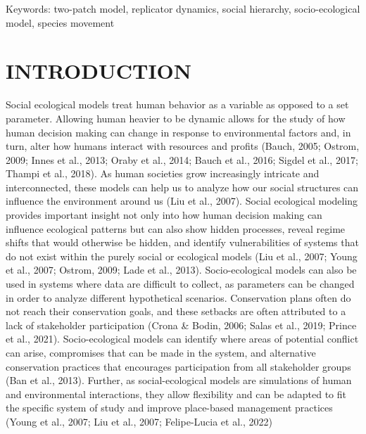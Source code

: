 \documentclass[
  12pt,
]{article}
\begin{document}
Keywords: two-patch model, replicator dynamics, social hierarchy, socio-ecological model, species movement

\hypertarget{introduction}{%
\section{INTRODUCTION}\label{introduction}}

Social ecological models treat human behavior as a variable as opposed to a set parameter. Allowing human heavier to be dynamic allows for the study of how human decision making can change in response to environmental factors and, in turn, alter how humans interact with resources and profits (Bauch, 2005; Ostrom, 2009; Innes et al., 2013; Oraby et al., 2014; Bauch et al., 2016; Sigdel et al., 2017; Thampi et al., 2018). As human societies grow increasingly intricate and interconnected, these models can help us to analyze how our social structures can influence the environment around us (Liu et al., 2007). Social ecological modeling provides important insight not only into how human decision making can influence ecological patterns but can also show hidden processes, reveal regime shifts that would otherwise be hidden, and identify vulnerabilities of systems that do not exist within the purely social or ecological models (Liu et al., 2007; Young et al., 2007; Ostrom, 2009; Lade et al., 2013). Socio-ecological models can also be used in systems where data are difficult to collect, as parameters can be changed in order to analyze different hypothetical scenarios. Conservation plans often do not reach their conservation goals, and these setbacks are often attributed to a lack of stakeholder participation (Crona \& Bodin, 2006; Salas et al., 2019; Prince et al., 2021). Socio-ecological models can identify where areas of potential conflict can arise, compromises that can be made in the system, and alternative conservation practices that encourages participation from all stakeholder groups (Ban et al., 2013). Further, as social-ecological models are simulations of human and environmental interactions, they allow flexibility and can be adapted to fit the specific system of study and improve place-based management practices (Young et al., 2007; Liu et al., 2007; Felipe-Lucia et al., 2022)
\end{document}
